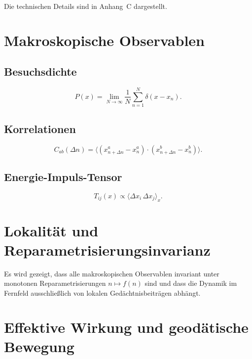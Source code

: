 \documentclass[11pt,a4paper]{article}
\begin{document}
Die technischen Details sind in Anhang~C dargestellt.

\section{Makroskopische Observablen}

\subsection{Besuchsdichte}

\begin{equation}
 P(x) = \lim_{N\to\infty} \frac{1}{N} \sum_{n=1}^N \delta(x-x_n).
\end{equation}

\subsection{Korrelationen}

\begin{equation}
 C_{ab}(\Delta n) = \langle (x^a_{n+\Delta n}-x^a_n) \cdot (x^b_{n+\Delta n}-x^b_n) \rangle.
\end{equation}

\subsection{Energie-Impuls-Tensor}

\begin{equation}
 T_{ij}(x) \propto \langle \Delta x_i \, \Delta x_j \rangle_x.
\end{equation}

\section{Lokalit\"at und Reparametrisierungsinvarianz}

Es wird gezeigt, dass alle makroskopischen Observablen invariant unter monotonen Reparametrisierungen $n \mapsto f(n)$ sind und dass die Dynamik im Fernfeld ausschließlich von lokalen Gedächtnisbeiträgen abhängt.

\section{Effektive Wirkung und geod\"atische Bewegung}
\end{document}

